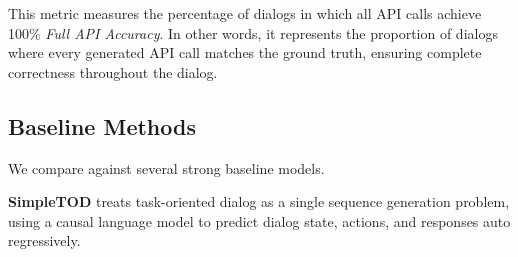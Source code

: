 


 This metric measures the percentage of dialogs in which all API calls achieve 100\% \emph{Full API Accuracy}. In other words, it represents the proportion of dialogs where every generated API call matches the ground truth, ensuring complete correctness throughout the dialog.

\subsection{Baseline Methods}



We compare {\ours} against several strong baseline models. %


\textbf{SimpleTOD} \cite{hosseini2020simple} treats task-oriented dialog as a single sequence generation problem, using a causal language model to predict dialog state, actions, and responses auto regressively. 

